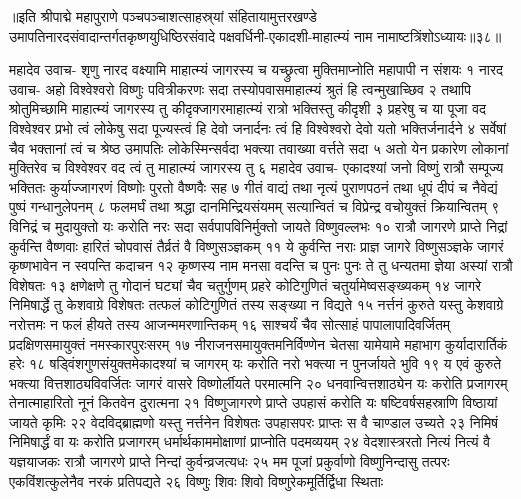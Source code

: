 ॥इति श्रीपाद्मे महापुराणे पञ्चपञ्चाशत्साहस्र्यां संहितायामुत्तरखण्डे उमापतिनारदसंवादान्तर्गतकृष्णयुधिष्ठिरसंवादे पक्षवर्धिनी-एकादशी-माहात्म्यं नाम नामाष्टत्रिंशोऽध्यायः॥३८॥



महादेव उवाच-
शृणु नारद वक्ष्यामि माहात्म्यं जागरस्य च 
यच्छ्रुत्वा मुक्तिमाप्नोति महापापी न संशयः १
नारद उवाच-
अहो विश्वेश्वरो विष्णुः पवित्रीकरणः सदा 
तस्योपवासमाहात्म्यं श्रुतं हि त्वन्मुखाच्छिव २
तथापि श्रोतुमिच्छामि माहात्म्यं जागरस्य तु  
कीदृक्जागरमाहात्म्यं रात्रो भक्तिस्तु  कीदृशी ३
प्रहरेषु च या पूजा वद विश्वेश्वर प्रभो 
त्वं लोकेषु सदा पूज्यस्त्वं हि देवो जनार्दनः 
त्वं हि विश्वेश्वरो देवो यतो भक्तिर्जनार्दने ४
सर्वेषां चैव भक्तानां त्वं च श्रेष्ठ उमापतिः 
लोकेस्मिन्सर्वदा भक्त्या तवाख्या वर्त्तते सदा ५
अतो येन प्रकारेण लोकानां मुक्तिरेव च 
विश्वेश्वर वद त्वं तु माहात्म्यं जागरस्य तु ६
महादेव उवाच-
एकादश्यां जनो विष्णुं रात्रौ सम्पूज्य भक्तितः 
कुर्याज्जागरणं विष्णोः पुरतो वैष्णवैः सह ७
गीतं वाद्यं तथा नृत्यं पुराणपठनं तथा 
धूपं दीपं च नैवेद्यं पुष्पं गन्धानुलेपनम् ८
फलमर्घं तथा श्रद्धा दानमिन्द्रियसंयमम् 
सत्यान्वितं च विप्रेन्द्र वचोयुक्तं क्रियान्वितम् ९
विनिद्रं च मुदायुक्तो यः करोति नरः सदा 
सर्वपापविनिर्मुक्तो जायते विष्णुवल्लभः १०
रात्रौ जागरणे प्राप्ते निद्रां कुर्वन्ति वैष्णवाः 
हारितं चोपवासं तैर्व्रतं वै विष्णुसञ्ज्ञकम् ११
ये कुर्वन्ति नराः प्राज्ञ जागरे विष्णुसञ्ज्ञके 
जागरं कृष्णभावेन न स्वपन्ति कदाचन १२
कृष्णस्य नाम मनसा वदन्ति च पुनः पुनः 
ते तु धन्यतमा ज्ञेया अस्यां रात्रौ विशेषतः १३
क्षणेक्षणे तु गोदानं घट्यां चैव चतुर्गुणम् 
प्रहरे कोटिगुणितं चतुर्यामेष्वसङ्ख्यकम् १४
जागरे निमिषार्द्धे तु केशवाग्रे विशेषतः 
तत्फलं कोटिगुणितं तस्य सङ्ख्या न विद्यते १५
नर्त्तनं कुरुते यस्तु केशवाग्रे नरोत्तमः 
न फलं हीयते तस्य आजन्ममरणान्तिकम् १६
साश्चर्यं चैव सोत्साहं पापालापादिवर्जितम् 
प्रदक्षिणसमायुक्तं नमस्कारपुरःसरम् १७
नीराजनसमायुक्तमनिर्विण्णेन चेतसा 
यामेयामे महाभाग कुर्यादारार्तिकं हरेः १८
षड्विंशगुणसंयुक्तमेकादश्यां च जागरम् 
यः करोति नरो भक्त्या न पुनर्जायते भुवि १९
य एवं कुरुते भक्त्या वित्तशाठ्यविवर्जितः 
जागरं वासरे विष्णोर्लीयते परमात्मनि २०
धनवान्वित्तशाठ्येन यः करोति प्रजागरम् 
तेनात्माहारितो नूनं कितवेन दुरात्मना २१
विष्णुजागरणे प्राप्ते उपहासं करोति यः 
षष्टिवर्षसहस्राणि विष्ठायां जायते कृमिः २२
वेदविद्ब्राह्मणो यस्तु नर्त्तनेन विशेषतः 
उपहासपरः प्राप्तः स वै चाण्डाल उच्यते २३
निमिषं निमिषार्द्धं वा यः करोति प्रजागरम् 
धर्मार्थकाममोक्षाणां प्राप्नोति पदमव्ययम् २४
वेदशास्त्ररतो नित्यं नित्यं वै यज्ञयाजकः 
रात्रौ जागरणे प्राप्ते निन्दां कुर्वन्व्रजत्यधः २५
मम पूजां प्रकुर्वाणो विष्णुनिन्दासु तत्परः 
एकविंशत्कुलेनैव नरकं प्रतिपद्यते २६
विष्णुः शिवः शिवो विष्णुरेकमूर्तिर्द्विधा स्थिताः 
